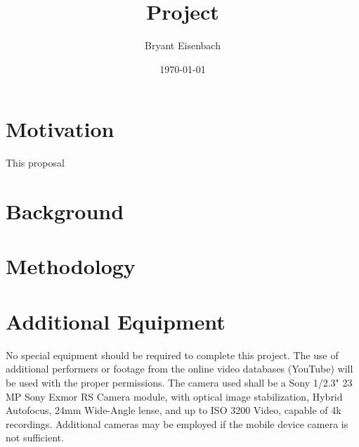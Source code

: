 \documentclass[titlepage]{article}
\author{Bryant Eisenbach}
\title{\project Project}
\date{\today}
\begin{document}
\section{Motivation}
This proposal 


\section{Background}


\section{Methodology}


\section{Additional Equipment}
No special equipment should be required to complete this project.
The use of additional performers or footage from the online video databases
(YouTube) will be used with the proper permissions.
The camera used shall be a Sony 1/2.3" 23 MP Sony Exmor RS Camera module,
with optical image stabilization, Hybrid Autofocus, 24mm Wide-Angle lense,
and up to ISO 3200 Video, capable of 4k recordings.
Additional cameras may be employed if the mobile device camera is not sufficient.

\pagebreak
\small
{}

\end{document}
